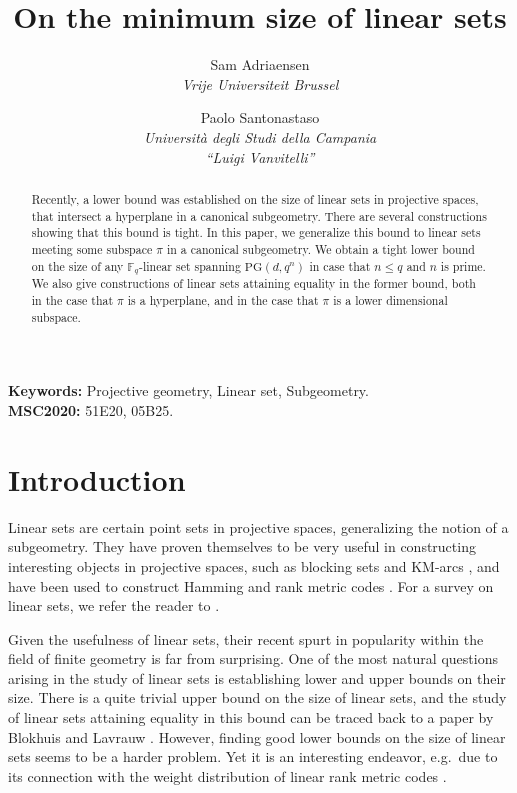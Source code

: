 \documentclass[11pt]{article}
\title{On the minimum size of linear sets}
\author{
 Sam Adriaensen \\ \textit{Vrije Universiteit Brussel} \and Paolo Santonastaso \\ \textit{Università degli
Studi della Campania} \\ \textit{``Luigi Vanvitelli''}
}
\date{ }
\theoremstyle{definition}
\newcommand{\fq}{{\mathbb F}_{q}}
\newcommand{\PG}{\mathrm{PG}}
\newcommand{\pg}{\PG}
\begin{document}
\maketitle

\begin{abstract}
 Recently, a lower bound was established on the size of linear sets in projective spaces, that intersect a hyperplane in a canonical subgeometry.
 There are several constructions showing that this bound is tight.
 In this paper, we generalize this bound to linear sets meeting some subspace $\pi$ in a canonical subgeometry.
 We obtain a tight lower bound on the size of any $\fq$-linear set spanning $\pg(d,q^n)$ in case that $n \leq q$ and $n$ is prime.
 We also give constructions of linear sets attaining equality in the former bound, both in the case that $\pi$ is a hyperplane, and in the case that $\pi$ is a lower dimensional subspace.
\end{abstract}

\noindent
\textbf{Keywords:} Projective geometry, Linear set, Subgeometry.\\
\textbf{MSC2020:} 51E20, 05B25.


\section{Introduction}

Linear sets are certain point sets in projective spaces, generalizing the notion of a subgeometry.
They have proven themselves to be very useful in constructing interesting objects in projective spaces, such as blocking sets \cite{sziklai2008onsmall} and KM-arcs \cite{deboeck2016alinearsetview}, and have been used to construct Hamming and rank metric codes \cite{polverino2022divisible,Napolitano2023twopoint,alfarano2021linearcutting,sheekey2016new, sheekeyVdV,polverino2020connections,zini2021scattered}.
For a survey on linear sets, we refer the reader to \cite{lavrauw2015field,polverino2010linear}.

Given the usefulness of linear sets, their recent spurt in popularity within the field of finite geometry is far from surprising.
One of the most natural questions arising in the study of linear sets is establishing lower and upper bounds on their size.
There is a quite trivial upper bound on the size of linear sets, and the study of linear sets attaining equality in this bound can be traced back to a paper by Blokhuis and Lavrauw \cite{blokhuis2000scattered}.
However, finding good lower bounds on the size of linear sets seems to be a harder problem.
Yet it is an interesting endeavor, e.g.\ due to its connection with the weight distribution of linear rank metric codes \cite{PolvSanZullo}.
\end{document}
